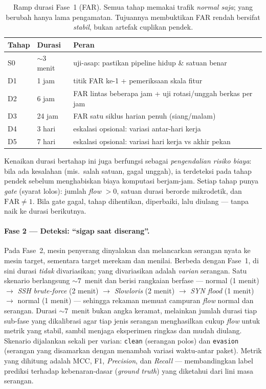 \documentclass[11pt,a4paper]{article}
\begin{document}
\begin{table}[h]
\centering
\caption{Ramp durasi Fase~1 (FAR). Semua tahap memakai trafik \emph{normal saja};
yang berubah hanya lama pengamatan. Tujuannya membuktikan FAR rendah bersifat
\emph{stabil}, bukan artefak cuplikan pendek.}
\label{tab:ramp}
\small
\begin{tabular}{llp{7.2cm}}
\toprule
Tahap & Durasi & Peran \\
\midrule
S0 & $\sim$3 menit & uji-asap: pastikan pipeline hidup \& satuan benar \\
D1 & 1 jam  & titik FAR ke-1 + pemeriksaan skala fitur \\
D2 & 6 jam  & FAR lintas beberapa jam + uji rotasi/unggah berkas per jam \\
D3 & 24 jam & FAR satu siklus harian penuh (siang/malam) \\
D4 & 3 hari & eskalasi opsional: variasi antar-hari kerja \\
D5 & 7 hari & eskalasi opsional: variasi hari kerja vs akhir pekan \\
\bottomrule
\end{tabular}
\end{table}

Kenaikan durasi bertahap ini juga berfungsi sebagai \emph{pengendalian risiko
biaya}: bila ada kesalahan (mis.\ salah satuan, gagal unggah), ia terdeteksi pada
tahap pendek sebelum menghabiskan biaya komputasi berjam-jam. Setiap tahap punya
\emph{gate} (syarat lolos): jumlah \emph{flow} $>0$, satuan durasi berorde
mikrodetik, dan $\mathrm{FAR}\neq 1$. Bila gate gagal, tahap dihentikan,
diperbaiki, lalu diulang --- tanpa naik ke durasi berikutnya.

\paragraph{Fase 2 --- Deteksi: ``sigap saat diserang''.}
Pada Fase~2, mesin penyerang dinyalakan dan melancarkan serangan nyata ke mesin
target, sementara target merekam dan menilai. Berbeda dengan Fase~1, di sini
durasi \emph{tidak} divariasikan; yang divariasikan adalah \emph{varian}
serangan. Satu skenario berlangsung $\sim$7~menit dan berisi rangkaian berfase
--- normal (1 menit) $\rightarrow$ \emph{SSH brute-force} (2 menit) $\rightarrow$
\emph{Slowloris} (2 menit) $\rightarrow$ \emph{SYN flood} (1 menit) $\rightarrow$
normal (1 menit) --- sehingga rekaman memuat campuran \emph{flow} normal dan
serangan. Durasi $\sim$7~menit bukan angka keramat, melainkan jumlah durasi tiap
sub-fase yang dikalibrasi agar tiap jenis serangan menghasilkan cukup \emph{flow}
untuk metrik yang stabil, sambil menjaga eksperimen ringkas dan mudah diulang.
Skenario dijalankan sekali per varian: \texttt{clean} (serangan polos) dan
\texttt{evasion} (serangan yang disamarkan dengan menambah variasi waktu-antar
paket). Metrik yang dihitung adalah MCC, F1, \emph{Precision}, dan \emph{Recall}
--- membandingkan label prediksi terhadap kebenaran-dasar (\emph{ground truth})
yang diketahui dari lini masa serangan.
\end{document}
